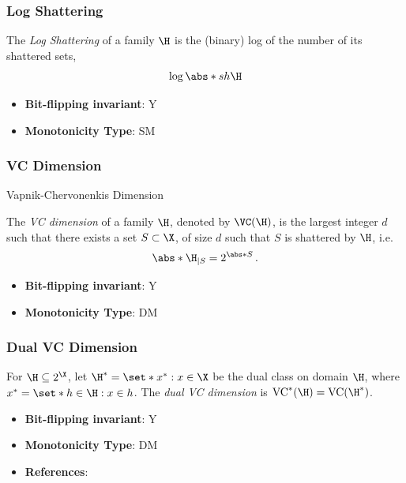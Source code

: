 \subsubsection{Log Shattering}
      
      \begin{definition}\label{def:log_shattering}
      The {\em Log Shattering} of a family $\H$ is the (binary) log of the number of its shattered sets, \[ \log \abs*{sh{\H}} \]
      \end{definition}
      \begin{itemize}
      \item {\bf Bit-flipping invariant}: Y
      \item {\bf Monotonicity Type}: SM
      \end{itemize}
\subsubsection{VC Dimension}
      Vapnik-Chervonenkis Dimension
      \begin{definition}\label{def:vc_dimension}
      The {\em VC dimension} of a family $\H$, denoted by $\VC(\H)$, is the largest integer $d$ such that there exists a set $S\subset \X$, of size $d$ such that $S$ is shattered by $\H$, i.e.  \[ \abs*{\H_{|S}} = 2^{\abs*{S}}\,. \]
      \end{definition}
      \begin{itemize}
      \item {\bf Bit-flipping invariant}: Y
      \item {\bf Monotonicity Type}: DM
      \end{itemize}
\subsubsection{Dual VC Dimension}
      \begin{definition}\label{def:dual_vc_dimension}
      For $\H\subseteq 2^\X$, let $\H^*=\set*{x^*:x\in\X}$ be the dual class on domain $\H$, where $x^*=\set*{h\in\H:x\in h}$.  The \emph{dual VC dimension} is $\mathrm{VC}^{*}(\H)=\mathrm{VC}(\H^*)$.
      \end{definition}
      \begin{itemize}
      \item {\bf Bit-flipping invariant}: Y
      \item {\bf Monotonicity Type}: DM
      \item {\bf References}: \cite{assouad1983densite}
      \end{itemize}
